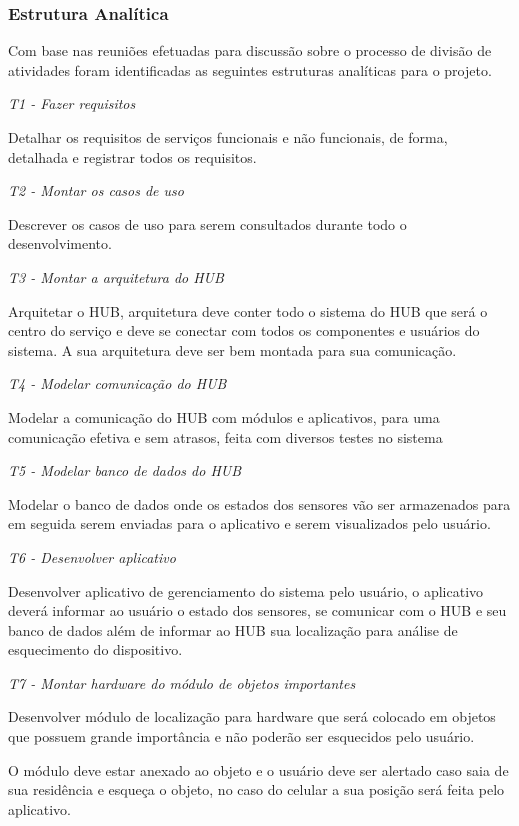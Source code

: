 \subsubsection*{Estrutura Analítica }

Com base nas reuniões efetuadas para discussão sobre o processo de divisão de atividades foram identificadas as seguintes estruturas analíticas para o projeto.

{\itshape T1 -\/ Fazer requisitos}

Detalhar os requisitos de serviços funcionais e não funcionais, de forma, detalhada e registrar todos os requisitos.

{\itshape T2 -\/ Montar os casos de uso}

Descrever os casos de uso para serem consultados durante todo o desenvolvimento.

{\itshape T3 -\/ Montar a arquitetura do H\+UB}

Arquitetar o H\+UB, arquitetura deve conter todo o sistema do H\+UB que será o centro do serviço e deve se conectar com todos os componentes e usuários do sistema. A sua arquitetura deve ser bem montada para sua comunicação.

{\itshape T4 -\/ Modelar comunicação do H\+UB}

Modelar a comunicação do H\+UB com módulos e aplicativos, para uma comunicação efetiva e sem atrasos, feita com diversos testes no sistema

{\itshape T5 -\/ Modelar banco de dados do H\+UB}

Modelar o banco de dados onde os estados dos sensores vão ser armazenados para em seguida serem enviadas para o aplicativo e serem visualizados pelo usuário.

{\itshape T6 -\/ Desenvolver aplicativo}

Desenvolver aplicativo de gerenciamento do sistema pelo usuário, o aplicativo deverá informar ao usuário o estado dos sensores, se comunicar com o H\+UB e seu banco de dados além de informar ao H\+UB sua localização para análise de esquecimento do dispositivo.

{\itshape T7 -\/ Montar hardware do módulo de objetos importantes}

Desenvolver módulo de localização para hardware que será colocado em objetos que possuem grande importância e não poderão ser esquecidos pelo usuário.

O módulo deve estar anexado ao objeto e o usuário deve ser alertado caso saia de sua residência e esqueça o objeto, no caso do celular a sua posição será feita pelo aplicativo.

